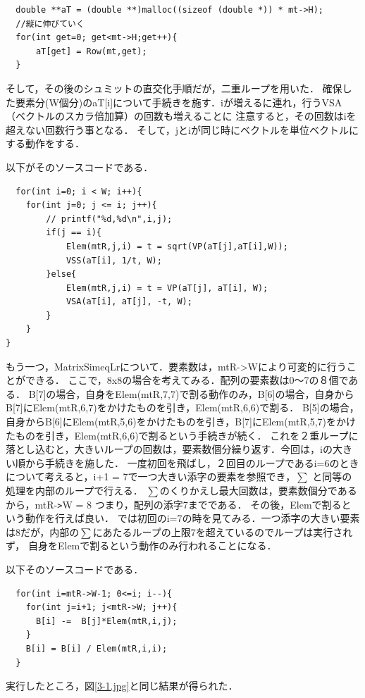 \documentclass[11pt]{jarticle}
\begin{document}
\begin{verbatim}
  double **aT = (double **)malloc((sizeof (double *)) * mt->H);
  //縦に伸びていく　
  for(int get=0; get<mt->H;get++){
      aT[get] = Row(mt,get);
  }
\end{verbatim}


そして，その後のシュミットの直交化手順だが，二重ループを用いた．
確保した要素分(W個分)のaT[i]について手続きを施す．iが増えるに連れ，行うVSA（ベクトルのスカラ倍加算）の回数も増えることに
注意すると，その回数はiを超えない回数行う事となる．
そして，jとiが同じ時にベクトルを単位ベクトルにする動作をする．

以下がそのソースコードである．
\begin{verbatim}
  for(int i=0; i < W; i++){
    for(int j=0; j <= i; j++){
        // printf("%d,%d\n",i,j);
        if(j == i){
            Elem(mtR,j,i) = t = sqrt(VP(aT[j],aT[i],W));
            VSS(aT[i], 1/t, W);
        }else{
            Elem(mtR,j,i) = t = VP(aT[j], aT[i], W);
            VSA(aT[i], aT[j], -t, W);
        }
    }
}
\end{verbatim}

もう一つ，MatrixSimeqLrについて．要素数は，mtR->Wにより可変的に行うことができる．
ここで，8x8の場合を考えてみる．配列の要素数は0～7の８個である．
B[7]の場合，自身をElem(mtR,7,7)で割る動作のみ，B[6]の場合，自身からB[7]にElem(mtR,6,7)をかけたものを引き，Elem(mtR,6,6)で割る．
B[5]の場合，自身からB[6]にElem(mtR,5,6)をかけたものを引き，B[7]にElem(mtR,5,7)をかけたものを引き，Elem(mtR,6,6)で割るという手続きが続く．
これを２重ループに落とし込むと，大きいループの回数は，要素数個分繰り返す．今回は，iの大きい順から手続きを施した．
一度初回を飛ばし，２回目のループであるi=6のときについて考えると，i+1 = 7で一つ大きい添字の要素を参照でき，$\sum$ と同等の処理を内部のループで行える．
$\sum$のくりかえし最大回数は，要素数個分であるから，mtR-\verb|>|W = 8 つまり，配列の添字7までである．
その後，Elemで割るという動作を行えば良い．
では初回のi=7の時を見てみる．一つ添字の大きい要素は8だが，内部の$\sum$にあたるループの上限7を超えているのでループは実行されず，
自身をElemで割るという動作のみ行われることになる．

以下そのソースコードである．
\begin{verbatim}
  for(int i=mtR->W-1; 0<=i; i--){
    for(int j=i+1; j<mtR->W; j++){
      B[i] -=  B[j]*Elem(mtR,i,j);
    }
    B[i] = B[i] / Elem(mtR,i,i);
  }
\end{verbatim}

実行したところ，図\ref{3-1.jpg}と同じ結果が得られた．
\end{document}
